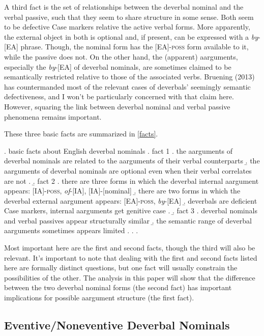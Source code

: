 \documentclass[12pt]{article}
\begin{document}
A third fact is the set of relationships between the deverbal nominal and the verbal passive, such that they seem to share structure in some sense. Both seem to be defective Case markers relative the active verbal forms. More apparently, the external object in both is optional and, if present, can be expressed with a \textit{by}-[EA] phrase. Though, the nominal form has the [EA]-\textsc{poss} form available to it, while the passive does not. On the other hand, the (apparent) aarguments, especially the \textit{by}-[EA] of deverbal nominals, are sometimes claimed to be semantically restricted relative to those of the associated verbs. Bruening (2013) has countermanded most of the relevant cases of deverbals' seemingly semantic defectiveness, and I won't be particularly concerned with that claim here. However, squaring the link between deverbal nominal and verbal passive phenomena remains important. 

These three basic facts are summarized in \ref{facts}.

\singlespacing

\ex. \label{facts} basic facts about English deverbal nominals
\a. fact 1
\a. the aarguments of deverbal nominals are related to the aarguments of their verbal counterparts
\b. the aarguments of deverbal nominals are optional even when their verbal correlates are not
\z.
\b. fact 2
\a. there are three forms in which the deverbal internal aargument appears: [IA]-\textsc{poss}, \textit{of}-[IA], [IA]-[nominal]
\b. there are two forms in which the deverbal external aargument appears: [EA]-\textsc{poss}, \textit{by}-[EA]
\b. deverbals are deficient Case markers, internal aarguments get genitive case
\z.
\b. fact 3
\a. deverbal nominals and verbal passives appear structurally similar
\b. the semantic range of deverbal aarguments sometimes appears limited
\z. \z. \z.

\doublespacing


\noindent Most important here are the first and second facts, though the third will also be relevant. It's important to note that dealing with the first and second facts listed here are formally distinct questions, but one fact will usually constrain the possibilities of the other. The analysis in this paper will show that the difference between the two deverbal nominal forms (the second fact) has important implications for possible aargument structure (the first fact).

\subsection{Eventive/Noneventive Deverbal Nominals}\label{facts2}
\end{document}
